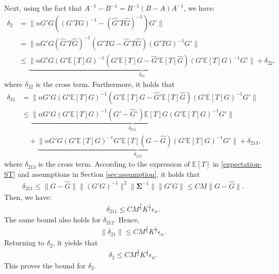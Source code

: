 \documentclass[preprint,11pt]{article}
\newcommand{\mbb}{\mathbb}
\numberwithin{equation}{section}
\begin{document}
Next, using the fact that $A^{-1}-B^{-1}=B^{-1}(B-A)A^{-1}$, we have:
\begin{align*}
    \delta_2&=\|nG'G((G'T G)^{-1}-(\widehat{G}'T\widehat{G})^{-1})G'\|\\
    &=\|nG'G(\widehat{G}'T\widehat{G})^{-1}(G'T G-\widehat{G}'T\widehat{G})(G'T G)^{-1}G'\|\\
    &\le \underbrace{\|nG'G(G'\mbb{E}[T]G)^{-1}(G'\mbb{E}[T] G-\widehat{G}'\mbb{E}[T]\widehat{G})(G'\mbb{E}[T] G)^{-1}G'\|}_{\delta_{21}}+\delta_{22},
\end{align*}
where $\delta_{22}$ is the cross term. Furthermore, it holds that
\begin{align*}
    \delta_{21}&= \|nG'G(G'\mbb{E}[T]G)^{-1}(G'\mbb{E}[T] G-\widehat{G}'\mbb{E}[T]\widehat{G})(G'\mbb{E}[T] G)^{-1}G'\|\\
    &\le \underbrace{\|nG'G(G'\mbb{E}[T]G)^{-1}(G'-\widehat{G}')\mbb{E}[T] G(G'\mbb{E}[T] G)^{-1}G'\|}_{\delta_{211}}\\
    &\quad+\underbrace{\|nG'G(G'\mbb{E}[T]G)^{-1}G'\mbb{E}[T] (G-\widehat{G})(G'\mbb{E}[T] G)^{-1}G'\|}_{\delta_{212}}+\delta_{213},
\end{align*}
where $\delta_{213}$ is the cross term. According to the expression of $\mathbb{E}[T]$ in \eqref{expectation-ST} and assumptions in Section \ref{sec:assumption}, it holds that
\begin{align*}
    \delta_{211}\le \|G-\widehat{G}\|\|(G'G)^{-1}\|^2\|\bm{\Sigma}^{-1}\|\|G'G\|\le CM\|G-\widehat{G}\|.
\end{align*}
Then, we have:
\begin{align*}
    \delta_{211}\le CM^{\frac{3}{2}}K^{\frac{1}{2}}\epsilon_n.
\end{align*}
The same bound also holds for $\delta_{212}$. Hence, 
\begin{align*}
    \|\delta_{21}\|\le CM^{\frac{3}{2}}K^{\frac{1}{2}}\epsilon_n.
\end{align*}
Returning to $\delta_2$, it yields that
\begin{align*}
    \delta_2\le CM^{\frac{3}{2}}K^{\frac{1}{2}}\epsilon_n.
\end{align*}
This proves the bound for $\delta_2$.
\end{document}

